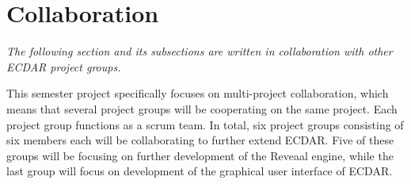 \section{Collaboration}\label{sec:cooperation}
\textit{The following section and its subsections are written in collaboration with other ECDAR project groups.}\vspace{1em}

\noindent This semester project specifically focuses on multi-project collaboration, which means that several project groups will be cooperating on the same project. 
Each project group functions as a scrum team. 
In total, six project groups consisting of six members each will be collaborating to further extend ECDAR. 
Five of these groups will be focusing on further development of the Reveaal engine, while the last group will focus on development of the graphical user interface of ECDAR.
